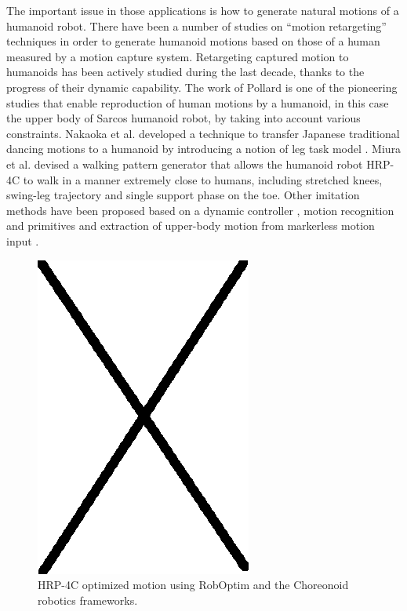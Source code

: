 \documentclass[letterpaper, 10 pt, conference]{ieeeconf}  %
\begin{document}
The important issue in those applications is how to generate natural
motions of a humanoid robot.  There have been a number of studies on
``motion retargeting'' techniques in order to generate humanoid
motions based on those of a human measured by a motion capture system.
Retargeting captured motion to humanoids has been actively studied
during the last decade, thanks to the progress of their dynamic
capability. The work of Pollard \cite{Pollard02ICRA} is one of the
pioneering studies that enable reproduction of human motions by a
humanoid, in this case the upper body of Sarcos humanoid robot, by
taking into account various constraints.  Nakaoka et al. developed a
technique to transfer Japanese traditional dancing motions to a
humanoid by introducing a notion of leg task model
\cite{nakaoka_icra2004,nakaoka_2007}.  Miura et al. \cite{Miura11IROS}
devised a walking pattern generator that allows the humanoid robot
HRP-4C to walk in a manner extremely close to humans, including
stretched knees, swing-leg trajectory and single support phase on the
toe.  Other imitation methods have been proposed based on a dynamic
controller \cite{Yamane11humanoids,Ramos11humanoids}, motion
recognition and primitives \cite{Ott08humanoids} and extraction of
upper-body motion from markerless motion input
\cite{Dariush08IROS,Do08humanoids}.


\begin{figure}
\begin{center}
  \includegraphics[width=0.6 \linewidth]{figure/fixme.png}
  \caption{HRP-4C optimized motion using RobOptim and the Choreonoid robotics frameworks.}
  \label{fig:choreonoid-result}
\end{center}
\end{figure}
\end{document}
